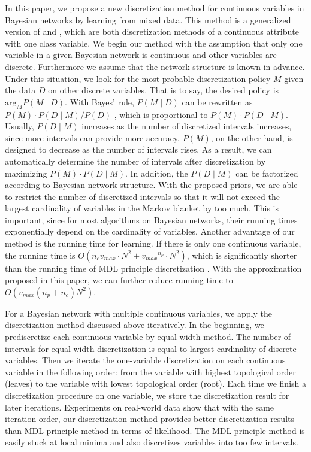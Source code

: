 In this paper, we propose a new discretization method for continuous variables in Bayesian networks by learning from mixed data. This method is a generalized version of  \citet{Boulle_2006} and \citet{Lustgarten_2011}, which are both discretization methods of a continuous attribute with one class variable. We begin our method with the assumption that only one variable in a given Bayesian network is continuous and other variables are discrete. Furthermore we assume that the network structure is known in advance. Under this situation, we look for the most probable discretization policy $M$ given the data $D$ on other discrete variables. That is to say, the desired policy is $\textrm{arg}_M P(M \mid D)$. With Bayes' rule, $P(M \mid D) $ can be rewritten as $P(M) \cdot P(D \mid M) / P(D)$ , which is proportional to $P(M)\cdot P(D \mid M)$. Usually, $P(D \mid M)$ increases as the number of discretized intervals increases, since more intervals can provide more accuracy. $P(M)$, on the other hand, is designed to decrease as the number of intervals rises. As a result, we can automatically determine the number of intervals after discretization by maximizing  $P(M)\cdot P(D \mid M)$. In addition, the $P(D \mid M)$ can be factorized according to Bayesian network structure. With the proposed priors, we are able to restrict the number of discretized intervals so that it will not exceed the largest cardinality of variables in the Markov blanket by too much. This is important, since for most algorithms on Bayesian networks, their running times exponentially depend on the cardinality of variables. Another advantage of our method is the running time for learning. If there is only one continuous variable, the running time is $O(n_c  {v_{max}} \cdot N^2 + {v_{max}}^{n_p} \cdot N^2)$, which is significantly shorter than the running time of MDL principle discretization \citep{Friedman_1996}. With the approximation proposed in this paper, we can further reduce running time to $O({v_{max}}(n_p+n_c)N^2)$.

For a Bayesian network with multiple continuous variables, we apply the discretization method discussed above iteratively. In the beginning, we prediscretize each continuous variable by equal-width method. The number of intervals for equal-width discretization is equal to largest cardinality of discrete variables. Then we iterate the one-variable discretization on each continuous variable in the following order: from the variable with highest topological order (leaves) to the variable with lowest topological order (root). Each time we finish a discretization procedure on one variable, we store the discretization result for later iterations. Experiments on real-world data show that with the same iteration order, our discretization method provides better discretization results than MDL principle method in terms of likelihood. The MDL principle method is easily stuck at local minima and also discretizes variables into too few intervals.

